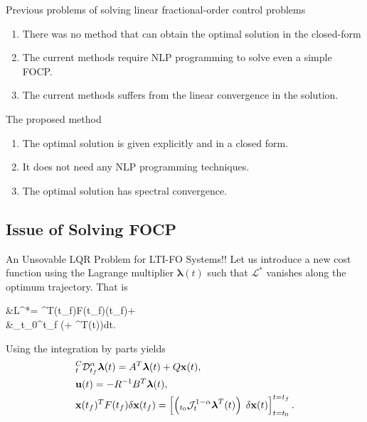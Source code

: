 \documentclass[
rightlogo=images/presentation/acc2020,
leftlogo=images/presentation/siue.png,
leftbottomlogo=images/presentation/adroco
]{ad-conference}
\begin{document}
\begin{frame}
	\begin{blockr}{ Previous problems of solving linear fractional-order control problems}
		\begin{enumerate}
			\item There was no method that can obtain the optimal solution in the closed-form
			\item The current methods require NLP programming to solve even a simple FOCP. 
			\item The current methods suffers from the linear convergence in the solution.
		\end{enumerate}
	\end{blockr}
	\pause
	\begin{blockb}{ The proposed method}
		\begin{enumerate}
			\item The optimal solution is given explicitly and in a closed form.
			\item It does not need any NLP programming techniques.
			\item The optimal solution has spectral convergence.
		\end{enumerate}
	\end{blockb}
	
\end{frame}

\subsection{Issue of Solving FOCP}
\begin{frame}[shrink=5]
	\begin{block}{An Unsovable LQR Problem for LTI-FO Systems!!}
		Let us introduce a new cost function using the Lagrange multiplier $ \boldsymbol{\lambda}(t) $ such that $ \mathcal L^* $ vanishes along the optimum trajectory. That is
		\begin{flalign}\label{eq:J}\nonumber
			&\mathcal L^*= \x^T(t_f)F(t_f)\x(t_f)+
			\nonumber\\
			&\int_{t_0}^{t_f} \Bigg(\parp{\x^T(t) Q \x(t)+\u^T(t) R \u(t)}+
			\boldsymbol{\lambda}^T(t)\Bigg)\;dt.
		\end{flalign}
	Using the integration by parts yields
	\begin{subequations}\label{eq:cond}
		\begin{flalign}
			& _{t}^{C} \mathcal D^{\alpha}_{t_f} \boldsymbol{\lambda}(t) = A^T\boldsymbol{\lambda}(t)+Q\mathbf{x}(t)  ,
			\\	
			&\mathbf u(t) =- R^{-1}B^T\boldsymbol{\lambda}(t),
			\\  
			&\mathbf{x}(t_f)^TF(t_f)\delta \mathbf{x}(t_f)=\left[{\left({_{t_0}\mathcal{J}^{1-\alpha}_t \boldsymbol{\lambda}^T(t)}\right)\; \delta\mathbf{x}(t)}\right]_{t=t_0}^{t=t_f}.
		\end{flalign}
	\end{subequations}
	\end{block}
\end{frame}
\end{document}
